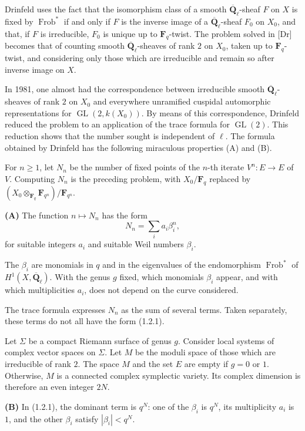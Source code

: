 \documentclass[11pt]{article}
\newcommand{\Fq}{\mathbf{F}_q}
\newcommand{\Fqn}{\mathbf{F}_{q^n}}
\newcommand{\Qbl}{\overline{\mathbf{Q}}_{\ell}}
\newcommand{\Frob}{\operatorname{Frob}}
\newcommand{\GL}{\operatorname{GL}}
\begin{document}
Drinfeld uses the fact that the isomorphism class of a smooth \(\Qbl\)-sheaf \(F\) on \(X\) is fixed by \(\Frob^*\) if and only if \(F\) is the inverse image of a \(\Qbl\)-sheaf \(F_0\) on \(X_0\), and that, if \(F\) is irreducible, \(F_0\) is unique up to \(\Fq\)-twist. The problem solved in [Dr] becomes that of counting smooth \(\Qbl\)-sheaves of rank \(2\) on \(X_0\), taken up to \(\Fq\)-twist, and considering only those which are irreducible and remain so after inverse image on \(X\).

In 1981, one almost had the correspondence between irreducible smooth \(\Qbl\)-sheaves of rank \(2\) on \(X_0\) and everywhere unramified cuspidal automorphic representations for \(\GL(2,k(X_0))\). By means of this correspondence, Drinfeld reduced the problem to an application of the trace formula for \(\GL(2)\). This reduction shows that the number sought is independent of \(\ell\). The formula obtained by Drinfeld has the following miraculous properties (A) and (B).

For \(n\ge 1\), let \(N_n\) be the number of fixed points of the \(n\)-th iterate \(V^n:E\to E\) of \(V\). Computing \(N_n\) is the preceding problem, with \(X_0/\Fq\) replaced by \((X_0\otimes_{\Fq}\Fqn)/\Fqn\).

\medskip
\noindent\textbf{(A)} The function \(n\mapsto N_n\) has the form
\begin{equation}
N_n=\sum_i a_i\beta_i^n,
\tag{1.2.1}
\end{equation}
for suitable integers \(a_i\) and suitable Weil numbers \(\beta_i\).

The \(\beta_i\) are monomials in \(q\) and in the eigenvalues of the endomorphism \(\Frob^*\) of \(H^1(X,\Qbl)\). With the genus \(g\) fixed, which monomials \(\beta_i\) appear, and with which multiplicities \(a_i\), does not depend on the curve considered.

The trace formula expresses \(N_n\) as the sum of several terms. Taken separately, these terms do not all have the form (1.2.1).

Let \(\Sigma\) be a compact Riemann surface of genus \(g\). Consider local systems of complex vector spaces on \(\Sigma\). Let \(M\) be the moduli space of those which are irreducible of rank \(2\). The space \(M\) and the set \(E\) are empty if \(g=0\) or \(1\). Otherwise, \(M\) is a connected complex symplectic variety. Its complex dimension is therefore an even integer \(2N\).

\medskip
\noindent\textbf{(B)} In (1.2.1), the dominant term is \(q^N\): one of the \(\beta_i\) is \(q^N\), its multiplicity \(a_i\) is \(1\), and the other \(\beta_i\) satisfy \(|\beta_i|<q^N\).
\end{document}
